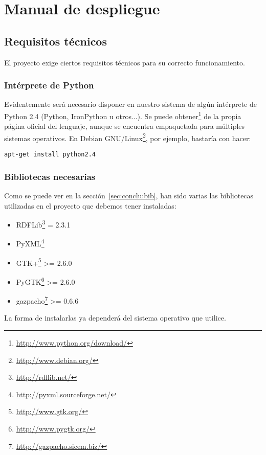 
\section{Manual de despliegue}

\subsection*{Requisitos técnicos}

El proyecto exige ciertos requisitos técnicos para su correcto
funcionamiento.

\subsubsection*{Intérprete de Python}

Evidentemente será necesario disponer en nuestro sistema de algún intérprete
de Python 2.4 (Python, IronPython u otros...). Se puede 
obtener\footnote{\url{http://www.python.org/download/}} de la propia página 
oficial del lenguaje, aunque se encuentra empaquetada para múltiples sistemas 
operativos. En Debian GNU/Linux\footnote{\url{http://www.debian.org/}}, por 
ejemplo, bastaría con hacer:

\begin{center}
	\texttt{apt-get install python2.4}
\end{center}

\subsubsection*{Bibliotecas necesarias}

Como se puede ver en la sección~\ref{sec:conclu:bib}, han sido varias las
bibliotecas utilizadas en el proyecto que debemos tener instaladas:

\begin{itemize}
  \item RDFLib\footnote{\url{http://rdflib.net/}} = 2.3.1
  \item PyXML\footnote{\url{http://pyxml.sourceforge.net/}}
  \item GTK+\footnote{\url{http://www.gtk.org/}} >= 2.6.0
  \item PyGTK\footnote{\url{http://www.pygtk.org/}} >= 2.6.0
  \item gazpacho\footnote{\url{http://gazpacho.sicem.biz/}} >= 0.6.6
\end{itemize}

La forma de instalarlas ya dependerá del sistema operativo que utilice.

